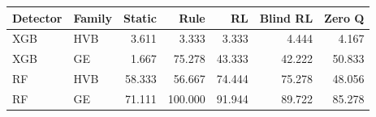 \begin{tabular}{llrrrrr}\toprule
Detector&Family&Static&Rule&RL&Blind RL&Zero Q\\\midrule
XGB & HVB & 3.611 & 3.333 & 3.333 & 4.444 & 4.167 \\
XGB & GE & 1.667 & 75.278 & 43.333 & 42.222 & 50.833 \\
RF & HVB & 58.333 & 56.667 & 74.444 & 75.278 & 48.056 \\
RF & GE & 71.111 & 100.000 & 91.944 & 89.722 & 85.278 \\
\bottomrule\end{tabular}
